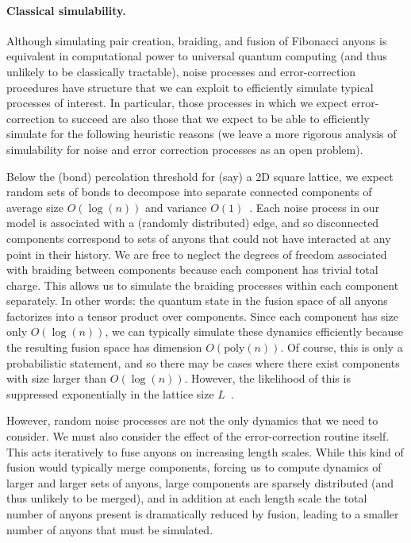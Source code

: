 \documentclass[aps, prl, letterpaper, twocolumn, superscriptaddress, notitlepage, 10pt]{revtex4-1}
\begin{document}
\paragraph{Classical simulability.}

Although simulating pair creation, braiding, and fusion of Fibonacci anyons is equivalent 
in computational power to universal quantum computing (and thus unlikely to be classically 
tractable), noise processes and error-correction procedures have structure that we can 
exploit to efficiently simulate typical processes of interest. In particular, those 
processes in which we expect error-correction to succeed are also those that we expect to 
be able to efficiently simulate for the following heuristic reasons 
(we leave a more rigorous analysis of simulability for noise 
and error correction processes as an open problem).

Below the (bond) percolation threshold for (say) a 2D square lattice, we expect random sets of 
bonds to decompose into separate connected components 
of average size $O(\log(n))$ and variance $O(1)$~\cite{Bazant2000}.
Each noise process in our model is associated with a (randomly distributed) edge, and so 
disconnected components correspond to sets of anyons that could not have interacted at any 
point in their history. 
We are free to neglect the degrees of freedom associated with braiding between components 
because each component has trivial total charge.
This allows us to simulate the braiding processes within each component separately. 
In other words: the quantum state in the fusion space of all anyons factorizes into 
a tensor product over components. 
Since each 
component has size only $O(\log(n))$, we can typically simulate these dynamics efficiently 
because the resulting fusion space has dimension $O(\mathrm{poly}(n))$. 
Of course, this is only a probabilistic statement, and so there may be cases where there exist components with size larger than $O(\log(n))$. However, the likelihood of this is suppressed exponentially in the lattice size $L$~\cite{Grimmett1989}. 

However, random noise processes are not the only dynamics that we need to consider. We 
must also consider the effect of the error-correction routine itself. This acts iteratively to fuse 
anyons on increasing length scales. While this kind of fusion would typically merge components, 
forcing us to compute dynamics of larger and larger sets of anyons,
large components are sparsely distributed
(and thus unlikely to be merged), and in addition at each length scale the total number of 
anyons present is dramatically reduced by fusion, leading to a smaller number of anyons that 
must be simulated.
\end{document}
